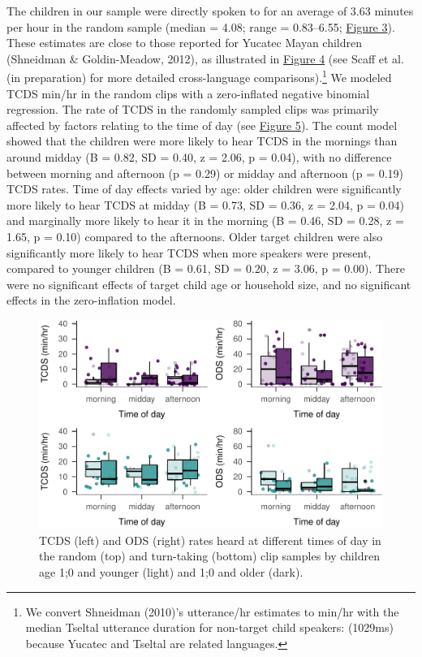 \documentclass[floatsintext,man]{apa6}
\theoremstyle{definition}
\theoremstyle{definition}
\theoremstyle{definition}
\theoremstyle{remark}
\begin{document}
The children in our sample were directly spoken to for an average of
3.63 minutes per hour in the random sample (median = 4.08; range =
0.83--6.55; \protect\hyperlink{fig3}{Figure 3}). These estimates are
close to those reported for Yucatec Mayan children (Shneidman \&
Goldin-Meadow, 2012), as illustrated in \protect\hyperlink{fig4}{Figure
4} (see Scaff et al. (in preparation) for more detailed cross-language
comparisons).\footnote{We convert Shneidman (2010)'s utterance/hr
  estimates to min/hr with the median Tseltal utterance duration for
  non-target child speakers: (1029ms) because Yucatec and Tseltal are
  related languages.} We modeled TCDS min/hr in the random clips with a
zero-inflated negative binomial regression. The rate of TCDS in the
randomly sampled clips was primarily affected by factors relating to the
time of day (see \protect\hyperlink{fig5}{Figure 5}). The count model
showed that the children were more likely to hear TCDS in the mornings
than around midday (B = 0.82, SD = 0.40, z = 2.06, p = 0.04), with no
difference between morning and afternoon (p = 0.29) or midday and
afternoon (p = 0.19) TCDS rates. Time of day effects varied by age:
older children were significantly more likely to hear TCDS at midday (B
= 0.73, SD = 0.36, z = 2.04, p = 0.04) and marginally more likely to
hear it in the morning (B = 0.46, SD = 0.28, z = 1.65, p = 0.10)
compared to the afternoons. Older target children were also
significantly more likely to hear TCDS when more speakers were present,
compared to younger children (B = 0.61, SD = 0.20, z = 3.06, p = 0.00).
There were no significant effects of target child age or household size,
and no significant effects in the zero-inflation model.

\begin{figure}
\centering
\includegraphics{Tseltal-CLE_files/figure-latex/fig5-1.pdf}
\caption{\label{fig:fig5}TCDS (left) and ODS (right) rates heard at
different times of day in the random (top) and turn-taking (bottom) clip
samples by children age 1;0 and younger (light) and 1;0 and older
(dark).}
\end{figure}
\end{document}
